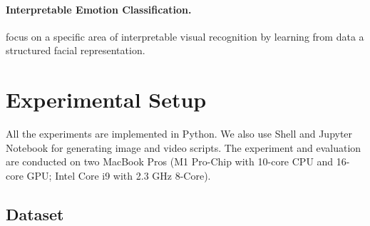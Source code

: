\paragraph{Interpretable Emotion Classification.}

\citet{YinTLS019} focus on a specific area of interpretable visual recognition by learning from data a structured facial representation. 
\citet{Malik0R21} 

\section{Experimental Setup}
\label{sec:setup}

All the experiments are implemented in Python. 
We also use Shell and Jupyter Notebook for generating image and video scripts. 
The experiment and evaluation are conducted on two MacBook Pros 
(M1 Pro-Chip with 10-core CPU and 16-core GPU; Intel Core i9 with 2.3 GHz 8-Core). 

\subsection{Dataset}
\label{sec:setup:datasets}


